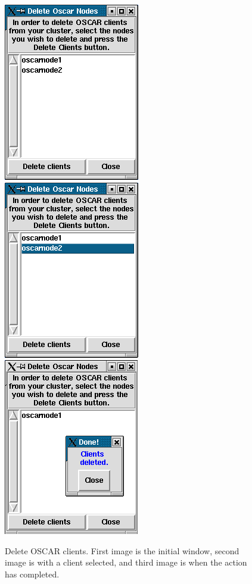 \begin{figure}[h!]
  \begin{center}
    \centerline{
      \includegraphics[scale=\imgscale]{figs/10a_sbs-del-node}
      \hspace{\imghskip}
      \includegraphics[scale=\imgscale]{figs/10b_sbs-del-node-partA}
      \hspace{\imghskip}
      \includegraphics[scale=\imgscale]{figs/10b_sbs-del-node-partB}
      }
    \caption[Delete OSCAR Clients.]{Delete OSCAR clients.  First image
    is the initial window, second image is with a client selected, and
    third image is when the action has completed.}
    \label{fig:sbs-del-node1}
  \end{center}
\end{figure}


